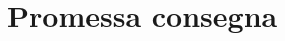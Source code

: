 \section{Promessa consegna}\label{section:Promessa_consegna}

\begin{comment}

\subsection{Informazioni generali}
	\begin {itemize}
		\item \textbf{Nome:} \textit{Bot4Me};
		\item \textbf{Proponente:} \textit{Imola Informatica};
		\item \textbf{Committente:} \textit{Prof. Tullio Vardanega e Prof. Riccardo Cardin}.
	\end{itemize}

	\subsection{Descrizione del capitolato}
		L’obiettivo del capitolato è quello di realizzare un'applicazione chatbot in grado di interpretare un flusso testuale (chat) che permetta ai dipendenti dell'azienda di eseguire operazioni di gestione e consuntivazione nel modo più intuitivo e user-friendly possibile.
		L'applicazione chatbot deve essere in grado, ad esempio, di eseguire le seguenti operazioni:
		\begin {itemize}
			\item Effettuare le operazioni di check-in e check-out sull’applicativo EMT;
			\item Inserire un consuntivo dell’attività giornaliera svolta sull’applicativo EMT;
			\item Aprire il cancello della sede aziendale;
			\item Creare una nuova riunione su un applicativo per videoconferenze;
			\item Ricercare dei documenti sul repository aziendale;
			\item Creare dei ticket di tracciamento per bug o progetti.
		\end{itemize}


\end{comment}
